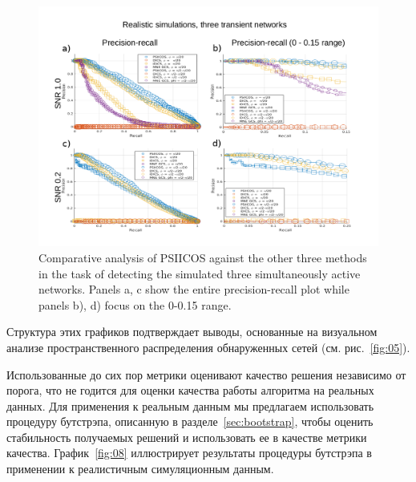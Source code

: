 \begin{figure}[!ht]
 \includegraphics[width=\textwidth]{../images/psiicos_paper/Figure7_hr.jpg}
 \caption{Comparative analysis of PSIICOS against the other three methods in
 the task of detecting the simulated three simultaneously active networks.
 Panels a, c show the entire precision-recall plot while panels b), d) focus on
 the 0-0.15 range.}\label{fig:07} %
\end{figure}%

Структура этих графиков подтверждает выводы, основанные на визуальном анализе
пространственного распределения обнаруженных сетей (см. рис.~\ref{fig:05}).

Использованные до сих пор метрики оценивают качество решения независимо от порога,
что не годится для оценки качества работы алгоритма на реальных данных.
Для применения к реальным данным мы предлагаем использовать процедуру бутстрэпа,
описанную в разделе~\ref{sec:bootstrap}, чтобы оценить стабильность
получаемых решений и использовать ее в качестве метрики качества.
График~\ref{fig:08} иллюстрирует результаты процедуры
бутстрэпа в применении к реалистичным симуляционным данным.

